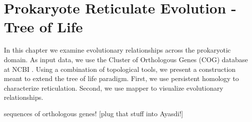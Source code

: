 \chapter{Prokaryote Reticulate Evolution - Tree of Life}
\label{ch:prokaryotes}

In this chapter we examine evolutionary relationships across the prokaryotic domain.
As input data, we use the Cluster of Orthologous Genes (COG) database at NCBI \cite{Galperin:2014ua}.
Using a combination of topological tools, we present a construction meant to extend the tree of life paradigm.
First, we use persistent homology to characterize reticulation.
Second, we use mapper to visualize evolutionary relationships.

sequences of orthologous genes! [plug that stuff into Ayasdi!]

\kje{[To Come.]}